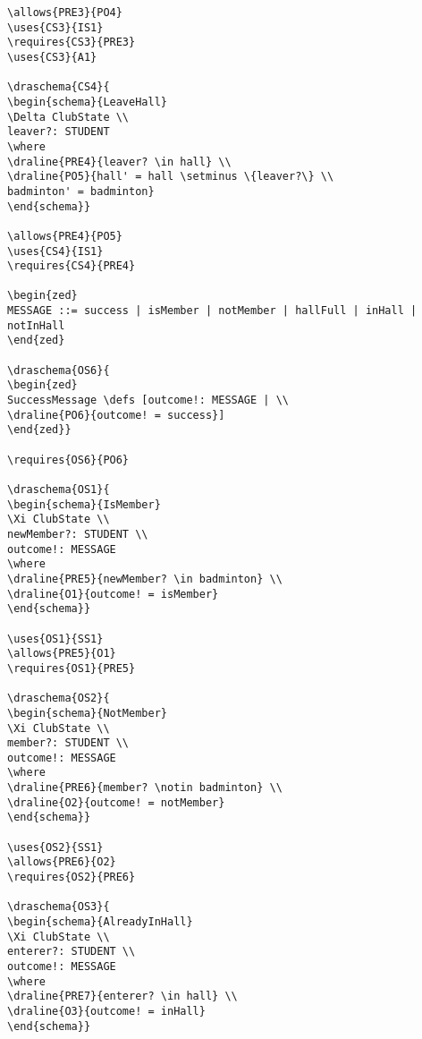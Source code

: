\begin{verbatim}
\allows{PRE3}{PO4}
\uses{CS3}{IS1}
\requires{CS3}{PRE3}
\uses{CS3}{A1}

\draschema{CS4}{
\begin{schema}{LeaveHall}
\Delta ClubState \\
leaver?: STUDENT
\where
\draline{PRE4}{leaver? \in hall} \\
\draline{PO5}{hall' = hall \setminus \{leaver?\} \\
badminton' = badminton}
\end{schema}}

\allows{PRE4}{PO5}
\uses{CS4}{IS1}
\requires{CS4}{PRE4}

\begin{zed}
MESSAGE ::= success | isMember | notMember | hallFull | inHall | notInHall
\end{zed}

\draschema{OS6}{
\begin{zed}
SuccessMessage \defs [outcome!: MESSAGE | \\
\draline{PO6}{outcome! = success}]
\end{zed}}

\requires{OS6}{PO6}

\draschema{OS1}{
\begin{schema}{IsMember}
\Xi ClubState \\
newMember?: STUDENT \\
outcome!: MESSAGE
\where
\draline{PRE5}{newMember? \in badminton} \\
\draline{O1}{outcome! = isMember}
\end{schema}}

\uses{OS1}{SS1}
\allows{PRE5}{O1}
\requires{OS1}{PRE5}

\draschema{OS2}{
\begin{schema}{NotMember}
\Xi ClubState \\
member?: STUDENT \\
outcome!: MESSAGE
\where
\draline{PRE6}{member? \notin badminton} \\
\draline{O2}{outcome! = notMember}
\end{schema}}

\uses{OS2}{SS1}
\allows{PRE6}{O2}
\requires{OS2}{PRE6}

\draschema{OS3}{
\begin{schema}{AlreadyInHall}
\Xi ClubState \\
enterer?: STUDENT \\
outcome!: MESSAGE
\where
\draline{PRE7}{enterer? \in hall} \\
\draline{O3}{outcome! = inHall}
\end{schema}}


\end{verbatim}
